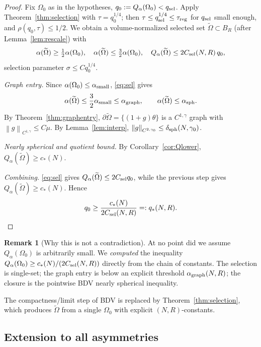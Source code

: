 \documentclass[11pt]{amsart}
\theoremstyle{definition}
\newtheorem{remark}[theorem]{Remark}
\newcommand{\norm}[1]{\left\|#1\right\|}
\begin{document}
\begin{proof}
Fix $\Omega_0$ as in the hypotheses, $q_0:=Q_\alpha(\Omega_0)<q_{\rm sel}$.
Apply Theorem~\ref{thm:selection} with $\tau=q_0^{1/4}$; then
$\tau\le q_{\rm sel}^{1/4}\le\tau_{\rm reg}$ for $q_{\rm sel}$ small enough,
and $\rho(q_0,\tau)\le1/2$. We obtain a volume-normalized selected set
$\widetilde\Omega\subset B_R$ (after Lemma~\ref{lem:rescale}) with
\begin{equation}\label{eq:sel}
\alpha(\widetilde\Omega)\ge\tfrac12\alpha(\Omega_0),
\quad
\alpha(\widetilde\Omega)\le\tfrac32\alpha(\Omega_0),
\quad
Q_\alpha(\widetilde\Omega)\le 2C_{\rm sel}(N,R)\,q_0,
\end{equation}
selection parameter $\sigma\le Cq_0^{1/4}$.

\emph{Graph entry.} Since $\alpha(\Omega_0)\le\alpha_{\rm small}$,
\eqref{eq:sel} gives
\[
\alpha(\widetilde\Omega)\le \frac32\alpha_{\rm small}
\le \alpha_{\rm graph},\qquad
\alpha(\widetilde\Omega)\le\alpha_{\rm sph}.
\]
By Theorem~\ref{thm:graphentry},
$\partial\widetilde\Omega=\{(1+g)\theta\}$ is a $C^{1,\gamma}$ graph with
$\norm{g}_{C^{1,\gamma}}\le C\mu$. By Lemma~\ref{lem:interp},
$\norm{g}_{C^{2,\gamma_0}}\le\delta_{\rm sph}(N,\gamma_0)$.

\emph{Nearly spherical and quotient bound.} By
Corollary~\ref{cor:Qlower}, $Q_\alpha(\widetilde\Omega)\ge c_*(N)$.

\emph{Combining.} \eqref{eq:sel} gives
$Q_\alpha(\widetilde\Omega)\le 2C_{\rm sel}q_0$, while the previous step gives
$Q_\alpha(\widetilde\Omega)\ge c_*(N)$. Hence
\[
q_0\ge\frac{c_*(N)}{2C_{\rm sel}(N,R)}=:q_*(N,R).
\]
\end{proof}

\begin{remark}[Why this is not a contradiction]
At no point did we assume $Q_\alpha(\Omega_0)$ is arbitrarily small. We
\emph{computed} the inequality
$Q_\alpha(\Omega_0)\ge c_*(N)/(2C_{\rm sel}(N,R))$
directly from the chain of constants. The selection is single-set; the
graph entry is below an explicit threshold $\alpha_{\rm graph}(N,R)$; the
closure is the pointwise BDV nearly spherical inequality.

The compactness/limit step of BDV is replaced by Theorem~\ref{thm:selection},
which produces $\widetilde\Omega$ from a single $\Omega_0$ with explicit
$(N,R)$-constants.
\end{remark}

\subsection{Extension to all asymmetries}
\end{document}
